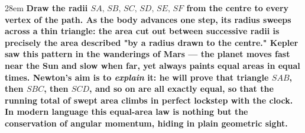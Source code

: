 \documentclass[border=4pt]{standalone}
\begin{document}
\begin{varwidth}{28em}
\large\bfseries
Draw the \textcolor{radigreen}{radii $SA,\,SB,\,SC,\,SD,\,SE,\,SF$} from the centre to every vertex of the path.      As the body advances one step, its radius sweeps across a thin triangle: the area cut out between      successive radii is precisely the area described "by a radius drawn to the centre." Kepler saw this pattern      in the wanderings of Mars — the planet moves fast near the Sun and slow when far, yet always paints equal      areas in equal times. Newton's aim is to \emph{explain} it: he will prove that triangle $SAB$, then $SBC$,      then $SCD$, and so on are all exactly equal, so that the running total of \textcolor{radigreen}{swept area} climbs in      perfect lockstep with the clock. In modern language this equal-area law is nothing but the conservation of      angular momentum, hiding in plain geometric sight.
\end{varwidth}
\end{document}
